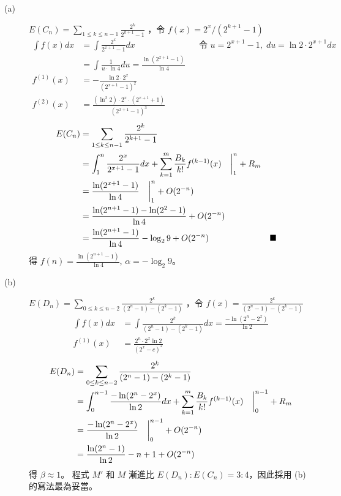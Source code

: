 \documentclass[11pt,fleqn]{article}
\begin{document}
\begin{description}
	\item[(a)] $E(C_n) = \sum_{1 \le k \le n-1} \frac{2^k}{2^{k+1}-1}$
		，令 $f(x) = 2^x / (2^{k+1}-1)$
		\begin{align*}
			\int f(x) dx &= \int \frac{2^x}{2^{x+1}-1} dx 
					&& \text{令 } u = 2^{x+1}-1, \; du = \ln 2 \cdot 2^{x+1} dx \\
				&= \int \frac{1}{u \cdot \ln 4} du = \frac{\ln (2^{x+1} - 1)}{\ln 4} \\
			f^{(1)}(x) &= - \frac{\ln2 \cdot 2^x}{(2^{x+1} - 1)^2} \\
			f^{(2)}(x) &= \frac{(\ln^2 2) \cdot 2^x \cdot (2^{x+1}+1)}{(2^{x+1}-1)^3}
		\end{align*}
		\begin{align*}
			E(C_n) &= \sum_{1 \le k \le n-1} \frac{2^k}{2^{k+1}-1} \\
				&= \int_{1}^{n} \frac{2^x}{2^{x+1}-1} dx + 
					\sum_{k=1}^{m} \frac{B_k}{k!} f^{(k-1)}(x) 
						\left.\phantom{0\over0} \right|^{n}_{1} + R_m \\
				&=  \frac{\ln (2^{x+1} - 1)}{\ln 4} \left.\phantom{0\over0} \right|^{n}_{1}
					+ O(2^{-n}) \phantom{0\over0} \\
				&=  \frac{\ln (2^{n+1}-1) - \ln (2^2 - 1)}{\ln 4} 
					+ O(2^{-n}) \phantom{0\over0} \\
				&=  \frac{\ln (2^{n+1}-1)}{\ln 4} - \log_2 9 
					+ O(2^{-n}) \phantom{0\over0} && \blacksquare \\
		\end{align*}
		得 $f(n) = \frac{\ln (2^{n+1}-1)}{\ln 4}$, $\alpha = - \log_2 9$。
	\item[(b)] $E(D_n) = \sum_{0 \le k \le n-2} \frac{2^k}{(2^n-1)-(2^{k}-1)}$
		，令 $f(x) = \frac{2^k}{(2^n-1)-(2^{k}-1)}$
		\begin{align*}
			\int f(x) dx &= \int \frac{2^k}{(2^n-1)-(2^{k}-1)} dx
				= \frac{- \ln (2^n - 2^x)}{\ln 2} \\
			f^{(1)}(x) &= \frac{2^n \cdot 2^x \ln 2}{(2^x - c)^2}
		\end{align*}
		\begin{align*}
			E(D_n) &= \sum_{0 \le k \le n-2} \frac{2^k}{(2^n-1)-(2^{k}-1)} \\
				&= \int_{0}^{n-1} \frac{- \ln (2^n - 2^x)}{\ln 2} dx + 
					\sum_{k=1}^{m} \frac{B_k}{k!} f^{(k-1)}(x) 
						\left.\phantom{0\over0} \right|^{n-1}_{0} + R_m \\
				&= \frac{- \ln (2^n - 2^x)}{\ln 2} \left.\phantom{0\over0} \right|^{n-1}_{0}
					+ O(2^{-n}) \phantom{0\over0} \\
				&= \frac{\ln (2^n - 1)}{\ln 2} - n + 1 + O(2^{-n})
		\end{align*}
		得 $\beta \approx 1$。
		程式 $M'$ 和 $M$ 漸進比 $E(D_n):E(C_n) = 3:4$，因此採用 (b) 的寫法最為妥當。
\end{description}
\end{document}
